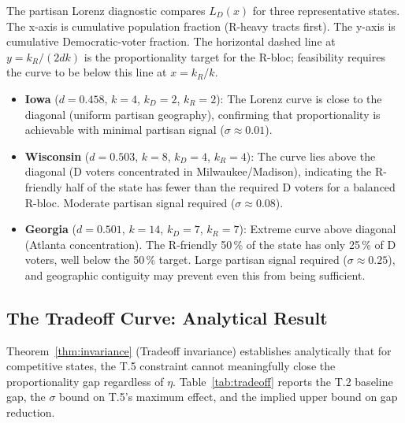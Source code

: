 The partisan Lorenz diagnostic compares $L_D(x)$ for three representative states.
The x-axis is cumulative population fraction (R-heavy tracts first).
The y-axis is cumulative Democratic-voter fraction.
The horizontal dashed line at $y = k_R/(2dk)$ is the proportionality target
for the R-bloc; feasibility requires the curve to be below this line at $x = k_R/k$.

\begin{itemize}
\item \textbf{Iowa} ($d = 0.458$, $k=4$, $k_D=2$, $k_R=2$): The Lorenz curve
  is close to the diagonal (uniform partisan geography), confirming that
  proportionality is achievable with minimal partisan signal ($\sigma \approx 0.01$).

\item \textbf{Wisconsin} ($d = 0.503$, $k=8$, $k_D=4$, $k_R=4$): The curve
  lies above the diagonal (D voters concentrated in Milwaukee/Madison),
  indicating the R-friendly half of the state has fewer than the required
  D voters for a balanced R-bloc. Moderate partisan signal required ($\sigma \approx 0.08$).

\item \textbf{Georgia} ($d = 0.501$, $k=14$, $k_D=7$, $k_R=7$): Extreme
  curve above diagonal (Atlanta concentration). The R-friendly 50\,\% of the
  state has only 25\,\% of D voters, well below the 50\,\% target. Large
  partisan signal required ($\sigma \approx 0.25$), and geographic contiguity
  may prevent even this from being sufficient.
\end{itemize}

\subsection{The Tradeoff Curve: Analytical Result}

Theorem~\ref{thm:invariance} (Tradeoff invariance) establishes analytically that
for competitive states, the T.5 constraint cannot meaningfully close the
proportionality gap regardless of $\eta$.
Table~\ref{tab:tradeoff} reports the T.2 baseline gap, the $\sigma$ bound
on T.5's maximum effect, and the implied upper bound on gap reduction.

